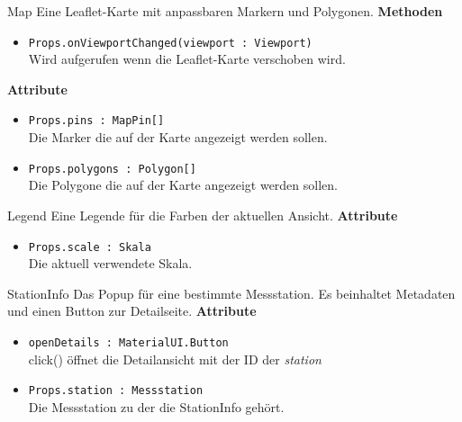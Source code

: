     \begin{Class}{Map}
        Eine Leaflet-Karte mit anpassbaren Markern und Polygonen.
        \textbf{Methoden}
        \begin{itemize}
            \item \texttt{Props.onViewportChanged(viewport : Viewport)}
            \\ Wird aufgerufen wenn die Leaflet-Karte verschoben wird.
        \end{itemize}
        \textbf{Attribute}
        \begin{itemize}
            \item \texttt{Props.pins : MapPin[]}
            \\ Die Marker die auf der Karte angezeigt werden sollen.
            \item \texttt{Props.polygons : Polygon[]}
            \\ Die Polygone die auf der Karte angezeigt werden sollen.
        \end{itemize}
    \end{Class}
    
    \begin{Class}{Legend}
        Eine Legende für die Farben der aktuellen Ansicht.
        \textbf{Attribute}
        \begin{itemize}
            \item \texttt{Props.scale : Skala}
            \\ Die aktuell verwendete Skala.
        \end{itemize}
    \end{Class}
    
    \begin{Class}{StationInfo}
        Das Popup für eine bestimmte Messstation. Es beinhaltet Metadaten und einen Button zur Detailseite.
        \textbf{Attribute}
        \begin{itemize}
            \item \texttt{openDetails : MaterialUI.Button}
            \\ click() öffnet die Detailansicht mit der ID der \emph{station}
            \item \texttt{Props.station : Messstation}
            \\ Die Messstation zu der die StationInfo gehört.
        \end{itemize}
    \end{Class}


